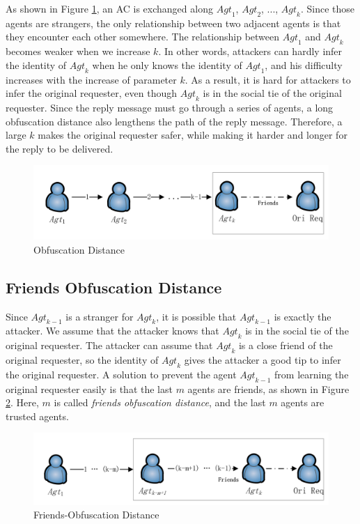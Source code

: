 As shown in Figure \ref{fig:ObfuscationDistance}, an AC is exchanged along ${Agt}_1$, ${Agt}_2$, ..., ${Agt}_k$. Since those agents are strangers, the only relationship between two adjacent agents is that they encounter each other somewhere. The relationship between ${Agt}_1$ and ${Agt}_k$ becomes weaker when we increase $k$. In other words, attackers can hardly infer the identity of ${Agt}_k$ when he only knows the identity of ${Agt}_1$, and his difficulty increases with the increase of parameter $k$. As a result, it is hard for attackers to infer the original requester, even though ${Agt}_k$ is in the social tie of the original requester. Since the reply message must go through a series of agents, a long obfuscation distance also lengthens the path of the reply message. Therefore, a large $k$ makes the original requester safer, while making it harder and longer for the reply to be delivered.

\begin{figure} [hbtp]
  \centering 
  \includegraphics[width=6.0in]{figures/ACPObfDis.png}
  \caption{Obfuscation Distance} 
  \label{fig:ObfuscationDistance} %
\end{figure}

\subsection{ Friends Obfuscation Distance}

\noindent Since ${Agt}_{k-1}$ is a stranger for ${Agt}_k$, it is possible that ${Agt}_{k-1}$ is exactly the attacker. We assume that the attacker knows that ${Agt}_k$ is in the social tie of the original requester. The attacker can assume that ${Agt}_k$ is a close friend of the original requester, so the identity of ${Agt}_k$ gives the attacker a good tip to infer the original requester. A solution to prevent the agent ${Agt}_{k-1}$ from learning the original requester easily is that the last $m$ agents are friends, as shown in Figure \ref{fig:FriObfuscationDistance}. Here, $m$ is called \textit{friends obfuscation distance}, and the last $m$ agents are trusted agents.

\begin{figure} [hbtp]
  \centering 
  \includegraphics[width=6.0in]{figures/ACPFriObfDis.png}
  \caption{Friends-Obfuscation Distance} 
  \label{fig:FriObfuscationDistance} %
\end{figure}

